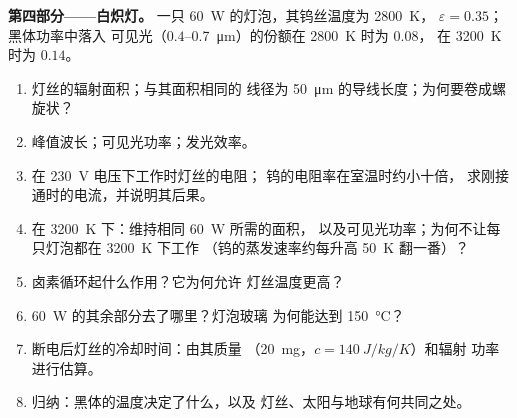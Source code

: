 \begin{problem}
\textbf{第四部分——白炽灯。}
一只 \qty{60}{W} 的灯泡，其钨丝温度为 \qty{2800}{K}，
$\varepsilon = 0.35$；黑体功率中落入
可见光（$0.4$--\qty{0.7}{\micro m}）的份额在 \qty{2800}{K} 时为 $0.08$，
在 \qty{3200}{K} 时为 $0.14$。
\begin{enumerate}[resume]
  \item 灯丝的辐射面积；与其面积相同的
        线径为 \qty{50}{\micro m} 的导线长度；为何要卷成螺旋状？
  \item 峰值波长；可见光功率；发光效率。
  \item 在 \qty{230}{V} 电压下工作时灯丝的电阻；
        钨的电阻率在室温时约小十倍，
        求刚接通时的电流，并说明其后果。
  \item 在 \qty{3200}{K} 下：维持相同 \qty{60}{W} 所需的面积，
        以及可见光功率；为何不让每只灯泡都在 \qty{3200}{K} 下工作
        （钨的蒸发速率约每升高
        \qty{50}{K} 翻一番）？
  \item 卤素循环起什么作用？它为何允许
        灯丝温度更高？
  \item \qty{60}{W} 的其余部分去了哪里？灯泡玻璃
        为何能达到 \qty{150}{\celsius}？
  \item 断电后灯丝的冷却时间：由其质量
        （\qty{20}{mg}，$c = \qty{140}{J/kg/K}$）和辐射
        功率进行估算。
  \item 归纳：黑体的温度决定了什么，以及
        灯丝、太阳与地球有何共同之处。
\end{enumerate}
\end{problem}
